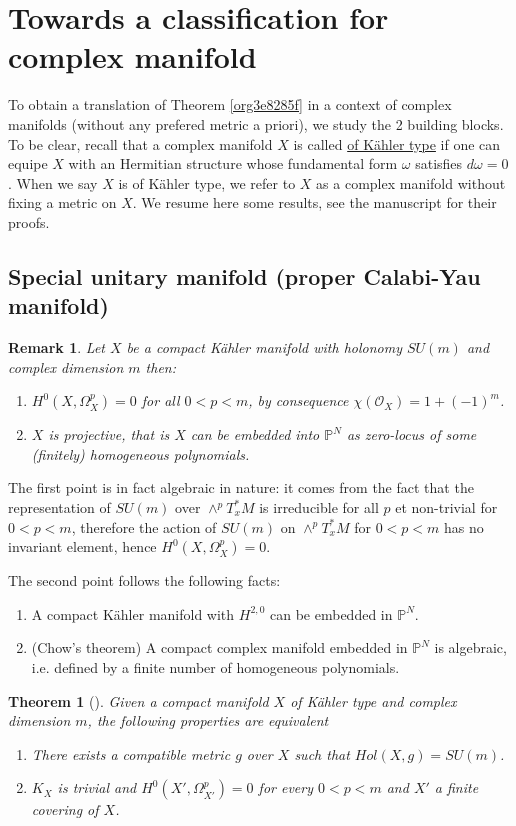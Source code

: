 \documentclass[11pt]{article}
\newtheorem{remark}{Remark}
\newtheorem{theorem}{Theorem}
\begin{document}
\section{Towards a classification for complex manifold}
\label{sec:org1a31a2d}
To obtain a translation of Theorem \ref{org3e8285f} in a context of complex manifolds (without any
prefered metric a priori), we study the 2 building blocks. To be clear, recall that a complex
manifold \(X\) is called \uline{of Kähler type} if one can equipe \(X\) with an Hermitian structure whose
fundamental form \(\omega\) satisfies \(d\omega= 0\). When we say \(X\) is of Kähler type, we refer to \(X\)
as a complex manifold without fixing a metric on \(X\). We resume here some results, see the
manuscript for their proofs.
\subsection{Special unitary manifold (proper Calabi-Yau manifold)}
\label{sec:orgdf3e282}
\begin{remark}
Let \(X\) be a compact Kähler manifold with holonomy \(SU(m)\) and complex dimension \(m\) then:
\begin{enumerate}
\item \(H^0(X, \Omega_X^p)=0\) for all \(0 < p < m\), by consequence \(\chi( \mathcal{O}_X ) = 1 + (-1)^m\).
\item \(X\) is \emph{projective}, that is \(X\) can be embedded into \(\mathbb{P}^N\) as zero-locus of some
(finitely) homogeneous polynomials.
\end{enumerate}
\end{remark}
The first point is in fact algebraic in nature: it comes from the fact that the representation of
\(SU(m)\) over \(\wedge^pT^*_xM\) is irreducible for all \(p\) et non-trivial for \(0<p<m\), therefore the
action of \(SU(m)\) on \(\wedge^pT^*_xM\) for \(0<p<m\) has no invariant element, hence
\(H^0(X,\Omega^p_X)=0\).


The second point follows the following facts:
\begin{enumerate}
\item A compact Kähler manifold with \(H^{2,0}\) can be embedded in \(\mathbb{P}^N\).
\item (Chow's theorem) A compact complex manifold embedded in \(\mathbb{P}^N\) is algebraic,
i.e. defined by a finite number of homogeneous polynomials.
\end{enumerate}

\begin{theorem}[]
Given a compact manifold \(X\) of Kähler type and complex dimension \(m\), the following properties are equivalent
\begin{enumerate}
\item There exists a compatible metric \(g\) over \(X\) such that \(Hol(X,g) = SU(m)\).
\item \(K_X\) is trivial and \(H^0(X', \Omega_{X'}^p) =0\) for every \(0 < p < m\) and \(X'\) a finite covering of \(X\).
\end{enumerate}
\end{theorem}
\end{document}
